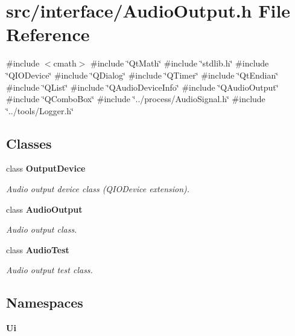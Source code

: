\section{src/interface/\+Audio\+Output.h File Reference}
\label{_audio_output_8h}
{\ttfamily \#include $<$cmath$>$}\newline
{\ttfamily \#include \char`\"{}Qt\+Math\char`\"{}}\newline
{\ttfamily \#include \char`\"{}stdlib.\+h\char`\"{}}\newline
{\ttfamily \#include \char`\"{}Q\+I\+O\+Device\char`\"{}}\newline
{\ttfamily \#include \char`\"{}Q\+Dialog\char`\"{}}\newline
{\ttfamily \#include \char`\"{}Q\+Timer\char`\"{}}\newline
{\ttfamily \#include \char`\"{}Qt\+Endian\char`\"{}}\newline
{\ttfamily \#include \char`\"{}Q\+List\char`\"{}}\newline
{\ttfamily \#include \char`\"{}Q\+Audio\+Device\+Info\char`\"{}}\newline
{\ttfamily \#include \char`\"{}Q\+Audio\+Output\char`\"{}}\newline
{\ttfamily \#include \char`\"{}Q\+Combo\+Box\char`\"{}}\newline
{\ttfamily \#include \char`\"{}../process/\+Audio\+Signal.\+h\char`\"{}}\newline
{\ttfamily \#include \char`\"{}../tools/\+Logger.\+h\char`\"{}}\newline
\subsection*{Classes}
\begin{DoxyCompactItemize}
\item 
class \textbf{ Output\+Device}
\begin{DoxyCompactList}\small\item\em Audio output device class (Q\+I\+O\+Device extension). \end{DoxyCompactList}\item 
class \textbf{ Audio\+Output}
\begin{DoxyCompactList}\small\item\em Audio output class. \end{DoxyCompactList}\item 
class \textbf{ Audio\+Test}
\begin{DoxyCompactList}\small\item\em Audio output test class. \end{DoxyCompactList}\end{DoxyCompactItemize}
\subsection*{Namespaces}
\begin{DoxyCompactItemize}
\item 
 \textbf{ Ui}
\end{DoxyCompactItemize}
